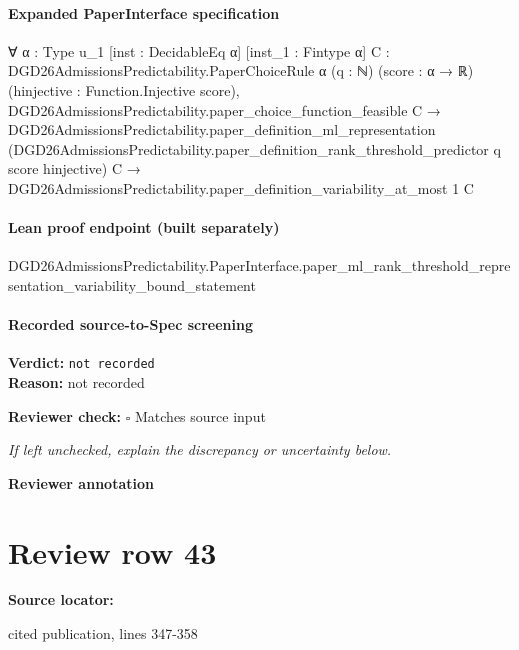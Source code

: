 \documentclass[10pt]{article}
\newcommand{\reviewerbox}{%
  \par\noindent\fbox{\parbox{0.96\linewidth}{\rule{0pt}{0.38in}}}\par
}
\newcommand{\reviewmatch}[1]{%
  \par\noindent\textbf{Reviewer check:} $\square$\; #1\par
  \noindent\emph{If left unchecked, explain the discrepancy or uncertainty below.}\par
}
\begin{document}
\paragraph{Expanded PaperInterface specification}
\begin{ReviewVerbatim}
∀ {α : Type u_1} [inst : DecidableEq α] [inst_1 : Fintype α] {C : DGD26AdmissionsPredictability.PaperChoiceRule α}
  (q : ℕ) (score : α → ℝ) (hinjective : Function.Injective score),
  DGD26AdmissionsPredictability.paper_choice_function_feasible C →
    DGD26AdmissionsPredictability.paper_definition_ml_representation
        (DGD26AdmissionsPredictability.paper_definition_rank_threshold_predictor q score hinjective) C →
      DGD26AdmissionsPredictability.paper_definition_variability_at_most 1 C
\end{ReviewVerbatim}

\paragraph{Lean proof endpoint (built separately)}\begin{ReviewVerbatim}
DGD26AdmissionsPredictability.PaperInterface.paper_ml_rank_threshold_representation_variability_bound_statement
\end{ReviewVerbatim}

\paragraph{Recorded source-to-Spec screening}
\textbf{Verdict:} \texttt{not recorded}
\\
\textbf{Reason:} not recorded
\reviewmatch{Matches source input}
\noindent\textbf{Reviewer annotation}\par
\reviewerbox
\clearpage
\hypertarget{source-claim-396063f8f4209701}{}
\section*{Review row 43}
\textbf{Source locator:} {\footnotesize\raggedright cited publication, lines 347-\allowbreak{}358\par}
\end{document}
